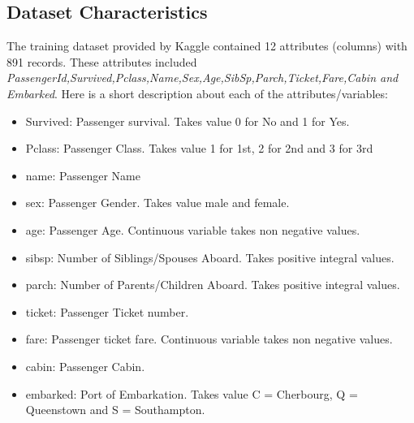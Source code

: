 \subsection{Dataset Characteristics}
The training dataset provided by Kaggle contained 12 attributes (columns) with 891 records. These attributes included \textit{PassengerId,Survived,Pclass,Name,Sex,Age,SibSp,Parch,Ticket,Fare,Cabin and Embarked}. Here is a short description about each of the attributes/variables:
\begin{itemize}
\item Survived: Passenger survival. Takes value 0 for No and 1 for Yes.
\item Pclass: Passenger Class. Takes value 1 for 1st, 2 for 2nd and 3 for 3rd
\item name: Passenger Name
\item sex: Passenger Gender. Takes value male and female.
\item age: Passenger Age. Continuous variable takes non negative values.
\item sibsp: Number of Siblings/Spouses Aboard. Takes positive integral values.
\item parch: Number of Parents/Children Aboard. Takes positive integral values.
\item ticket: Passenger Ticket number.
\item fare: Passenger ticket fare. Continuous variable takes non negative values.
\item cabin: Passenger Cabin.
\item embarked: Port of Embarkation. Takes value C = Cherbourg, Q = Queenstown and S = Southampton.
\end{itemize}


